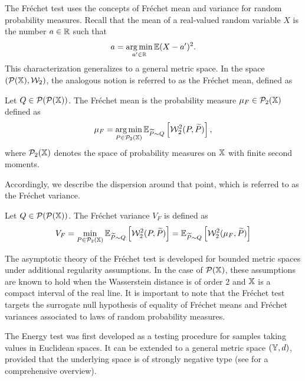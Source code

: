 The Fr\'echet test uses the concepts of Fr\'echet mean and variance for random probability measures. Recall that the mean of a real-valued random variable $X$ is the number $a \in \mathbb{R}$ such that
\[
a = \operatorname*{arg\,min}_{a' \in \mathbb{R}}\mathbb{E} (X-a')^2.
\]
This characterization generalizes to a general metric space. In the space $(\mathcal{P}(\mathbb{X}),\mathcal{W}_2)$, the analogous notion is referred to as the Fr\'echet mean, defined as
\begin{definition}
\label{definition:Frechet_mean}
Let $Q \in \mathcal{P}(\mathcal{P}(\mathbb{X}))$. The Fr\'{e}chet mean is the probability measure $\mu_{F} \in \mathcal{P}_2(\mathbb{X})$ defined as
\[
\mu_{F} = \operatorname*{arg\,min}_{P \in \mathcal{P}_2(\mathbb{X})} \mathbb{E}_{\widetilde{P}\sim Q} \left[\mathcal{W}^2_2(P, \widetilde{P})\right],
\]
where $\mathcal{P}_2(\mathbb{X})$ denotes the space of probability measures on $\mathbb{X}$ with finite second moments.
\end{definition}
Accordingly, we describe the dispersion around that point, which is referred to as the Fr\'echet variance.
\begin{definition}
\label{definition:Frechet_variance}
Let $Q \in \mathcal{P}(\mathcal{P}(\mathbb{X}))$. The Fr\'echet variance $V_{F}$ is defined as
\[
V_{F} = \min_{P \in \mathcal{P}_2(\mathbb{X})}\mathbb{E}_{\widetilde{P}\sim Q} \left[\mathcal{W}^2_2(P, \widetilde{P})\right] 
= \mathbb{E}_{\widetilde{P}\sim Q} \left[\mathcal{W}^2_2(\mu_F, \widetilde{P})\right]
\]
\end{definition}
The asymptotic theory of the Fr\'echet test is developed for bounded metric spaces under additional regularity assumptions. In the case of $\mathcal{P}(\mathbb{X})$, these assumptions are known to hold when the Wasserstein distance is of order $2$ and $\mathbb{X}$ is a compact interval of the real line. It is important to note that the Fr\'echet test targets the surrogate null hypothesis of equality of Fr\'echet means and Fr\'echet variances associated to laws of random probability measures.


The Energy test was first developed as a testing procedure for samples taking values in Euclidean spaces. It can be extended to a general metric space $(\mathbb{Y},d)$, provided that the underlying space is of strongly negative type (see \cite{lyons2013distance} for a comprehensive overview).

